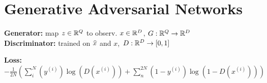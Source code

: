 \section{Generative Adversarial Networks}

\textbf{Generator:} map $z \in \mathbb{R}^Q$ to observ. $x \in \mathbb{R}^D$, $G: \mathbb{R}^Q \rightarrow \mathbb{R}^D$\\
\textbf{Discriminator:} trained on $\widehat{x}$ and $x$, $D: \mathbb{R}^D \rightarrow [0,1]$\\

\textbf{Loss:}$-\frac{1}{2N}(\sum_i^N (y^{(i)}) \log(D(x^{(i)})) + \sum_n^{2N} (1 - y^{(i)}) \log(1 - D(x^{(i)})))$\\

